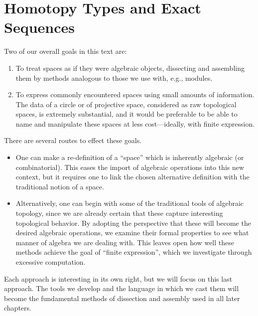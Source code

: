
\chapter{Homotopy Types and Exact Sequences}

Two of our overall goals in this text are:
\begin{enumerate}
    \item
    To treat spaces as if they were algebraic objects, dissecting and assembling them by methods analogous to those we use with, e.g., modules.
    \item
    To express commonly encountered spaces using small amounts of information.
    The data of a circle or of projective space, considered as raw topological spaces, is extremely substantial, and it would be preferable to be able to name and manipulate these spaces at less cost---ideally, with finite expression.
\end{enumerate}

\noindent
There are several routes to effect these goals.

\begin{itemize}
    \item
    One can make a re-definition of a ``space'' which is inherently algebraic (or combinatorial).
    This eases the import of algebraic operations into this new context, but it requires one to link the chosen alternative definition with the traditional notion of a space.%
    \item
    Alternatively, one can begin with some of the traditional tools of algebraic topology, since we are already certain that these capture interesting topological behavior.
    By adopting the perspective that these will become the desired algebraic operations, we examine their formal properties to see what manner of algebra we are dealing with.
    This leaves open how well these methods achieve the goal of ``finite expression'', which we investigate through excessive computation.
\end{itemize}

\noindent
Each approach is interesting in its own right, but we will focus on this last approach.
The tools we develop and the language in which we cast them will become the fundamental methods of dissection and assembly used in all later chapters.




